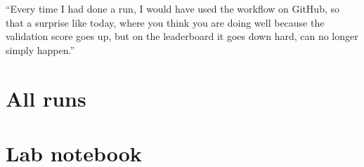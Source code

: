 \documentclass[11pt]{article}
\begin{document}
``Every time I had done a run, I would have used the workflow on GitHub, so that a surprise like today, where you think you are doing well because the validation score goes up, but on the leaderboard it goes down hard, can no longer simply happen.''

\section*{All runs}

\section*{Lab notebook}
\end{document}
